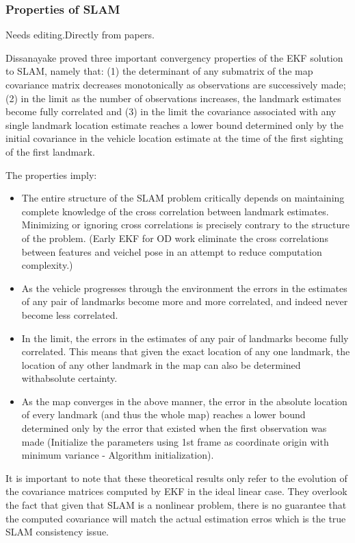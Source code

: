 \subsubsection{Properties of SLAM}
\label{sec:SLAM_properties}


Needs editing.Directly from papers.

Dissanayake proved three important convergency properties of the EKF 
solution to SLAM, namely that: (1) the determinant of any submatrix of 
the map covariance matrix decreases monotonically as observations are 
successively made; (2) in the limit as the number of observations 
increases, the landmark estimates become fully correlated and (3) in the 
limit the covariance associated with any single landmark location 
estimate reaches a lower bound determined only by the initial covariance 
in the vehicle location estimate at the time of the first sighting of 
the first landmark.

The properties imply:

\begin{itemize}
  \item The entire structure of the SLAM problem critically depends on 
  maintaining complete knowledge of the cross correlation between landmark 
  estimates. Minimizing or ignoring cross correlations is precisely 
  contrary to the structure of the problem. (Early EKF for OD work 
  eliminate the cross correlations between features and veichel pose in an 
  attempt to reduce computation complexity.)
  \item As the vehicle progresses through the environment the errors in 
  the estimates of any pair of landmarks become more and more correlated, 
  and indeed never become less correlated.
  \item In the limit, the errors in the estimates of any pair of landmarks 
  become fully correlated. This means that given the exact location of any 
  one landmark, the location of any other landmark in the map can also be 
  determined withabsolute certainty.
  \item As the map converges in the above manner, the error in the 
  absolute location of every landmark (and thus the whole map) reaches a 
  lower bound determined only by the error that existed when the first 
  observation was made (Initialize the parameters using 1st frame as 
  coordinate origin with minimum variance - Algorithm initialization).
\end{itemize}
It is important to note that these theoretical results only refer to the 
evolution of the covariance matrices computed by EKF in the ideal linear 
case. They overlook the fact that given that SLAM is a nonlinear 
problem, there is no guarantee that the computed covariance will match 
the actual estimation erros which is the true SLAM consistency issue. 

